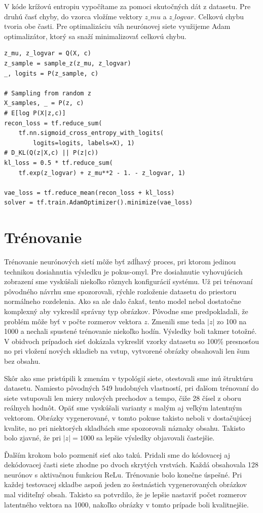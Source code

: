 V kóde krížovú entropiu vypočítame za pomoci skutočných dát z datasetu.
Pre druhú časť chyby, do vzorca vložíme vektory \(z\_mu\) a \(z\_logvar\).
Celkovú chybu tvoria obe časti.
Pre optimalizáciu váh neurónovej siete využijeme Adam optimalizátor, ktorý sa snaží minimalizovať celkovú chybu.
\begin{verbatim}
z_mu, z_logvar = Q(X, c)
z_sample = sample_z(z_mu, z_logvar)
_, logits = P(z_sample, c)

# Sampling from random z
X_samples, _ = P(z, c)
# E[log P(X|z,c)]
recon_loss = tf.reduce_sum(
	tf.nn.sigmoid_cross_entropy_with_logits(
		logits=logits, labels=X), 1)
# D_KL(Q(z|X,c) || P(z|c))
kl_loss = 0.5 * tf.reduce_sum(
	tf.exp(z_logvar) + z_mu**2 - 1. - z_logvar, 1)

vae_loss = tf.reduce_mean(recon_loss + kl_loss)
solver = tf.train.AdamOptimizer().minimize(vae_loss)
\end{verbatim}

\section{Trénovanie}
Trénovanie neurónových sietí môže byť zdĺhavý proces, pri ktorom jedinou technikou dosiahnutia výsledku je pokus-omyl.
Pre dosiahnutie vyhovujúcich zobrazení sme vyskúšali niekoľko rôznych konfigurácií systému.
Už pri trénovaní pôvodného návrhu sme spozorovali, rýchle rozloženie datasetu do priestoru normálneho rozdelenia.
Ako sa ale dalo čakať, tento model nebol dostatočne komplexný aby vykreslil správny typ obrázkov.
Pôvodne sme predpokladali, že problém môže byť v počte rozmerov vektora \(z\).
Zmenili sme teda \(|z|\) zo 100 na 1000 a nechali spustené trénovanie niekoľko hodín.
Výsledky boli takmer totožné.
V obidvoch prípadoch sieť dokázala vykresliť vzorky datasetu so 100\% presnosťou no pri vložení nových skladieb na vstup, vytvorené obrázky obsahovali len šum bez obsahu.

Skôr ako sme pristúpili k zmenám v typológií siete, otestovali sme inú štruktúru datasetu.
Namiesto pôvodných 549 hudobných vlastností, pri ďalšom trénovaní do siete vstupovali len miery nulových prechodov a tempo, čiže 28 čísel z oboru reálnych hodnôt.
Opäť sme vyskúšali varianty s malým aj veľkým latentným vektorom.
Obrázky vygenerované, v tomto pokuse takisto neboli v dostačujúcej kvalite, no pri niektorých skladbách sme spozorovali náznaky obsahu.
Takisto bolo zjavné, že pri \(|z| = 1000\) sa lepšie výsledky objavovali častejšie.

Ďalším krokom bolo pozmeniť sieť ako takú.
Pridali sme do kódovacej aj dekódovacej časti siete zhodne po dvoch skrytých vrstvách.
Každá obsahovala 128 neurónov s aktivačnou funkciou ReLu.
Trénovanie bolo konečne úspešné.
Pri každej testovacej skladbe aspoň jeden zo šestnástich vygenerovaných obrázkov mal viditeľný obsah.
Takisto sa potvrdilo, že je lepšie nastaviť počet rozmerov latentného vektora na 1000, nakoľko obrázky v tomto prípade boli kvalitnejšie.

